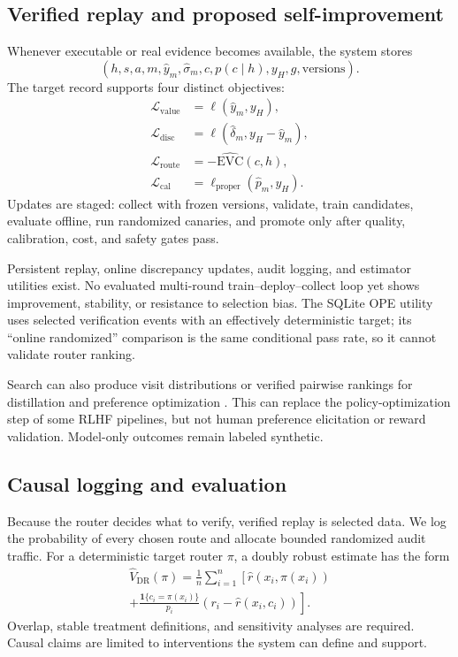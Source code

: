 \documentclass[10pt,twocolumn]{article}
\begin{document}
\subsection{Verified replay and proposed self-improvement}

Whenever executable or real evidence becomes available, the system stores
\[
(h,s,a,m,\hat y_m,\hat \sigma_m,
 c,p(c\mid h),y_H,g,\mathrm{versions}).
\]
The target record supports four distinct objectives:
\begin{align}
\mathcal{L}_{\mathrm{value}} &=
  \ell(\hat y_m,y_H),\\
\mathcal{L}_{\mathrm{disc}} &=
  \ell(\hat\delta_m,y_H-\hat y_m),\\
\mathcal{L}_{\mathrm{route}} &=
  -\widehat{\mathrm{EVC}}(c,h),\\
\mathcal{L}_{\mathrm{cal}} &=
  \ell_{\mathrm{proper}}(\hat p_m,y_H).
\end{align}
Updates are staged: collect with frozen versions, validate, train candidates,
evaluate offline, run randomized canaries, and promote only after quality,
calibration, cost, and safety gates pass.

Persistent replay, online discrepancy updates, audit logging, and estimator
utilities exist. No evaluated multi-round train--deploy--collect loop yet shows
improvement, stability, or resistance to selection bias. The SQLite OPE utility
uses selected verification events with an effectively deterministic target;
its ``online randomized'' comparison is the same conditional pass rate, so it
cannot validate router ranking.

Search can also produce visit distributions or verified pairwise rankings for
distillation and preference optimization
\citep{feng2024tsllm,xu2025mctsep}. This can replace the policy-optimization
step of some RLHF pipelines, but not human preference elicitation or reward
validation. Model-only outcomes remain labeled synthetic.

\subsection{Causal logging and evaluation}

Because the router decides what to verify, verified replay is selected data.
We log the probability of every chosen route and allocate bounded randomized
audit traffic. For a deterministic target router \(\pi\), a doubly robust
estimate has the form
\begin{multline}
\widehat V_{\mathrm{DR}}(\pi)
=\frac{1}{n}\sum_{i=1}^n
\left[
\hat r(x_i,\pi(x_i)) \right.\\
\left.
+\frac{\mathbf{1}\{c_i=\pi(x_i)\}}{p_i}
\left(r_i-\hat r(x_i,c_i)\right)
\right].
\end{multline}
Overlap, stable treatment definitions, and sensitivity analyses are required.
Causal claims are limited to interventions the system can define and support.
\end{document}
